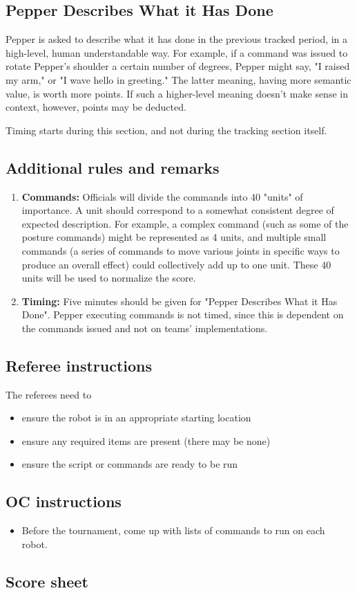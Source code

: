 \subsection{Pepper Describes What it Has Done}
Pepper is asked to describe what it has done in the previous tracked period, in a high-level, human understandable way.  For example, if a command was issued to rotate Pepper's shoulder a certain number of degrees, Pepper might say, "I raised my arm," or "I wave hello in greeting."  The latter meaning, having more semantic value, is worth more points. If such a higher-level meaning doesn't make sense in context, however, points may be deducted.

Timing starts during this section, and not during the tracking section itself.

\subsection{Additional rules and remarks}
\begin{enumerate}
	\item \textbf{Commands:} Officials will divide the commands into 40 "units" of importance.  A unit should correspond to a somewhat consistent degree of expected description.  For example, a complex command (such as some of the posture commands) might be represented as 4 units, and multiple small commands (a series of commands to move various joints in specific ways to produce an overall effect) could collectively add up to one unit.   These 40 units will be used to normalize the score.

	\item \textbf{Timing:} Five minutes should be given for "Pepper Describes What it Has Done".  Pepper executing commands is not timed, since this is dependent on the commands issued and not on teams' implementations.

\end{enumerate}

\subsection{Referee instructions}

The referees need to
\begin{itemize}
	\item ensure the robot is in an appropriate starting location
	\item ensure any required items are present (there may be none)
    \item ensure the script or commands are ready to be run
\end{itemize}

\subsection{OC instructions}

\begin{itemize}
	\item Before the tournament, come up with lists of commands to run on each robot.
\end{itemize}

\newpage
\subsection{Score sheet}

